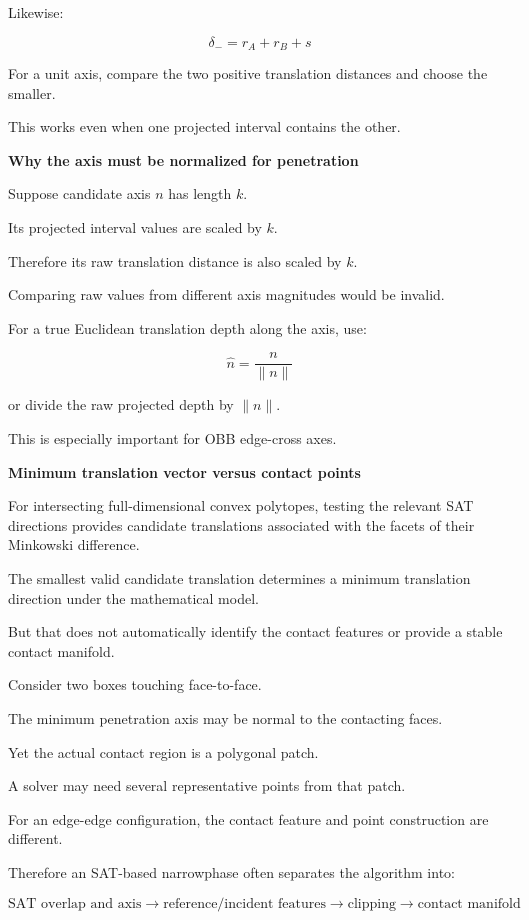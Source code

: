 Likewise:

\[
\boxed{ \delta_-=r_A+r_B+s }
\]

For a unit axis, compare the two positive translation distances and choose the smaller.

This works even when one projected interval contains the other.

\textbf{Why the axis must be normalized for penetration}

Suppose candidate axis \(n\) has length \(k\).

Its projected interval values are scaled by \(k\).

Therefore its raw translation distance is also scaled by \(k\).

Comparing raw values from different axis magnitudes would be invalid.

For a true Euclidean translation depth along the axis, use:

\[
\boxed{ \hat n=\frac n{\|n\|} }
\]

or divide the raw projected depth by \(\|n\|\).

This is especially important for OBB edge-cross axes.

\textbf{Minimum translation vector versus contact points}

For intersecting full-dimensional convex polytopes, testing the relevant SAT directions provides candidate translations associated with the facets of their Minkowski difference.

The smallest valid candidate translation determines a minimum translation direction under the mathematical model.

But that does not automatically identify the contact features or provide a stable contact manifold.

Consider two boxes touching face-to-face.

The minimum penetration axis may be normal to the contacting faces.

Yet the actual contact region is a polygonal patch.

A solver may need several representative points from that patch.

For an edge-edge configuration, the contact feature and point construction are different.

Therefore an SAT-based narrowphase often separates the algorithm into:

\[
\boxed{ \text{SAT overlap and axis} \rightarrow \text{reference/incident features} \rightarrow \text{clipping} \rightarrow \text{contact manifold} }
\]

